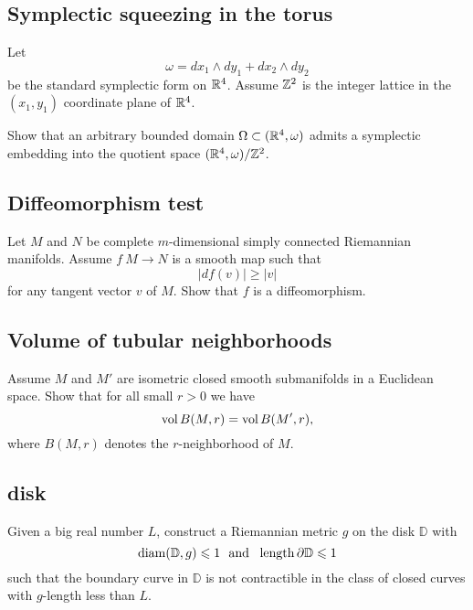 \subsection*{Symplectic squeezing in the torus}
\label{Symplectic squeezing in the torus}



\begin{pr}
Let 
\[\omega=dx_1\wedge dy_1+ dx_2\wedge dy_2\]
be the standard symplectic form on $\mathbb{R}^4$.
Assume $\mathbb{Z}^2$ is the integer lattice in the $(x_1,y_1)$ coordinate plane of $\mathbb{R}^4$.

Show that an arbitrary bounded domain $\Omega\subset (\mathbb{R}^4,\omega)$
admits a symplectic embedding into the quotient space $(\mathbb{R}^4,\omega)/\mathbb{Z}^2$. 
\end{pr}

\subsection*{Diffeomorphism test\easy}
\label{Diffeomorphism test}


\begin{pr}
Let $M$ and $N$ be 
complete 
$m$-dimensional
simply connected 
Riemannian manifolds.
Assume $f\:M\to N$
is a smooth map such that 
$$|df(v)|\ge |v|$$
for any tangent vector $v$ of $M$.
Show that $f$ is a diffeomorphism.
\end{pr}

\subsection*{Volume of tubular neighborhoods\thm}
\label{Volume of tubular neighborhoods}

\begin{pr}
Assume $M$ and $M'$ are isometric closed smooth submanifolds in a Euclidean space.
Show that for all small $r>0$ we have
$$\operatorname{\rm vol}\nolimits B(M,r)=\operatorname{\rm vol}\nolimits B(M',r),$$
where $B(M,r)$ denotes the $r$-neighborhood of $M$.
\end{pr}

\subsection*{disk\hard}
\label{disk}

\begin{pr}
Given a big real number $L$,
construct a Riemannian metric $g$ on the disk $\mathbb D$ 
with 
\[\diam(\mathbb D,g)\le 1
\ \ 
\text{and}
\ \ 
\length \partial\mathbb D\le 1  \]
such that the boundary curve in $\mathbb D$ is not contractible in the class of closed curves with $g$-length less than $L$.
\end{pr}

